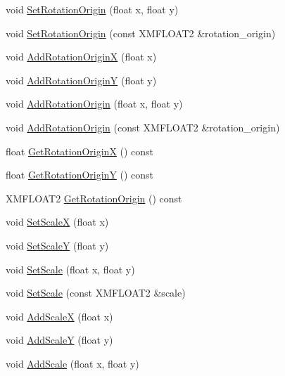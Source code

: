 \begin{DoxyCompactItemize}
\item 
void \hyperlink{structmage_1_1_sprite_transform_a48e720840181b0da09989b739102c294}{Set\+Rotation\+Origin} (float x, float y)
\item 
void \hyperlink{structmage_1_1_sprite_transform_ab8eb3ba0c307d8267486f016da679e3e}{Set\+Rotation\+Origin} (const X\+M\+F\+L\+O\+A\+T2 \&rotation\+\_\+origin)
\item 
void \hyperlink{structmage_1_1_sprite_transform_a2ee0eacdef5904f5f95ec5dd306bb56e}{Add\+Rotation\+OriginX} (float x)
\item 
void \hyperlink{structmage_1_1_sprite_transform_a47808a3521d3c083b3fd0203fbd21b5c}{Add\+Rotation\+OriginY} (float y)
\item 
void \hyperlink{structmage_1_1_sprite_transform_a70a7fa7de4a563e4093400c3f60effbe}{Add\+Rotation\+Origin} (float x, float y)
\item 
void \hyperlink{structmage_1_1_sprite_transform_a16689c2da63a2b59186950cb9936d695}{Add\+Rotation\+Origin} (const X\+M\+F\+L\+O\+A\+T2 \&rotation\+\_\+origin)
\item 
float \hyperlink{structmage_1_1_sprite_transform_abf3a72d9f594aa157608070d69f4428e}{Get\+Rotation\+OriginX} () const
\item 
float \hyperlink{structmage_1_1_sprite_transform_a0f6056a96c419817211efce6687e1d89}{Get\+Rotation\+OriginY} () const
\item 
X\+M\+F\+L\+O\+A\+T2 \hyperlink{structmage_1_1_sprite_transform_af3a00260c5346a32a9f81efcf0f48a6a}{Get\+Rotation\+Origin} () const
\item 
void \hyperlink{structmage_1_1_sprite_transform_a90394102afd9d31dd426668aea210ed0}{Set\+ScaleX} (float x)
\item 
void \hyperlink{structmage_1_1_sprite_transform_a321067fab6d62931e17f1604ce50709d}{Set\+ScaleY} (float y)
\item 
void \hyperlink{structmage_1_1_sprite_transform_abc9fdab6e961508423befabd0648dab6}{Set\+Scale} (float x, float y)
\item 
void \hyperlink{structmage_1_1_sprite_transform_a24008167674c9fb524c48214e6893c1d}{Set\+Scale} (const X\+M\+F\+L\+O\+A\+T2 \&scale)
\item 
void \hyperlink{structmage_1_1_sprite_transform_aff82cf6bde45535de538fe93cf99d4c5}{Add\+ScaleX} (float x)
\item 
void \hyperlink{structmage_1_1_sprite_transform_a8cc05bfa72d615c99fc5c3cfcef8e096}{Add\+ScaleY} (float y)
\item 
void \hyperlink{structmage_1_1_sprite_transform_a4e260b9085f2609523979a7a0446c748}{Add\+Scale} (float x, float y)

\end{DoxyCompactItemize}
